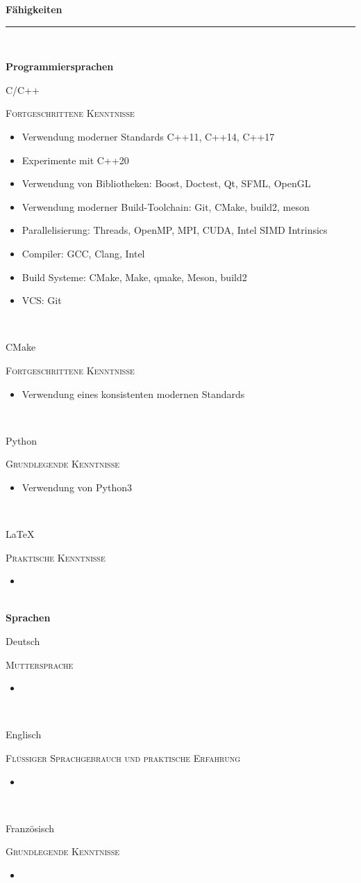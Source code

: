 \documentclass[8pt]{article}
\newcommand{\cvSection}[1]{
  {\Large \textbf{#1}}\\
  \rule{\linewidth}{1pt}\\
  \par
}
\newcommand{\cvEducationHeading}[2]{%
  \textbf{#1} \hfill \textit{\footnotesize #2} \\[1em]
}
\newenvironment{cvEducationItem}[2]{
  \begin{minipage}[t]{\textwidth}
  \begin{minipage}[t]{0.1\textwidth}
    \raggedleft
    \small
    #1
  \end{minipage}
  \quad
  \vrule
  \quad
  \begin{minipage}[t]{0.8\textwidth}
    \textsc{\small #2}
    \begin{itemize}
      \itemsep0pt
      \footnotesize
}{
    \end{itemize}
  \end{minipage}
  \end{minipage}\\[1em]
}
\begin{document}
  \cvSection{Fähigkeiten}

  \cvEducationHeading{Programmiersprachen}{}
  \begin{cvEducationItem}{C/C++}{Fortgeschrittene Kenntnisse}
    \item Verwendung moderner Standards C++11, C++14, C++17
    \item Experimente mit C++20
    \item Verwendung von Bibliotheken: Boost, Doctest, Qt, SFML, OpenGL
    \item Verwendung moderner Build-Toolchain: Git, CMake, build2, meson
    \item Parallelisierung: Threads, OpenMP, MPI, CUDA, Intel SIMD Intrinsics
    \item Compiler: GCC, Clang, Intel
    \item Build Systeme: CMake, Make, qmake, Meson, build2
    \item VCS: Git
  \end{cvEducationItem}
  \begin{cvEducationItem}{CMake}{Fortgeschrittene Kenntnisse}
    \item Verwendung eines konsistenten modernen Standards
  \end{cvEducationItem}
  \begin{cvEducationItem}{Python}{Grundlegende Kenntnisse}
    \item Verwendung von Python3
  \end{cvEducationItem}
  \begin{cvEducationItem}{LaTeX}{Praktische Kenntnisse}
    \item
  \end{cvEducationItem}
  \cvEducationHeading{Sprachen}{}
  \begin{cvEducationItem}{Deutsch}{Muttersprache}
    \item
  \end{cvEducationItem}
  \begin{cvEducationItem}{Englisch}{Flüssiger Sprachgebrauch und praktische Erfahrung}
    \item
  \end{cvEducationItem}
  \begin{cvEducationItem}{Französisch}{Grundlegende Kenntnisse}
    \item
  \end{cvEducationItem}
\end{document}
